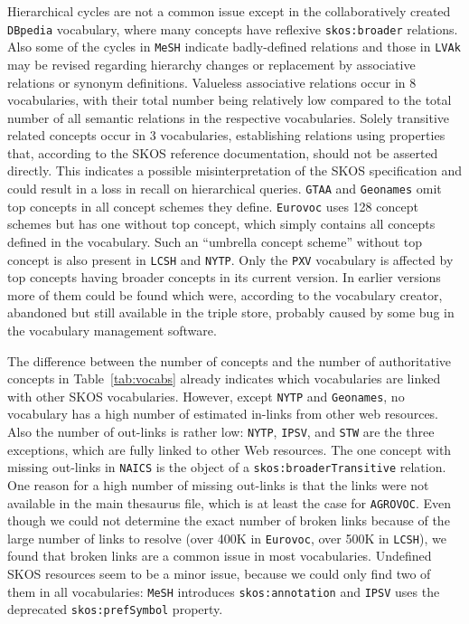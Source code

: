 Hierarchical cycles are not a common issue except in the collaboratively created \texttt{DBpedia} vocabulary, where many concepts have reflexive \texttt{skos:broader} relations. Also some of the cycles in \texttt{MeSH} indicate badly-defined relations and those in \texttt{LVAk} may be revised regarding hierarchy changes or replacement by associative relations or synonym definitions.
Valueless associative relations occur in 8 vocabularies, with their total number being relatively low compared to the total number of all semantic relations in the respective vocabularies.
Solely transitive related concepts occur in 3 vocabularies, establishing relations using properties that, according to the SKOS reference documentation, should not be asserted directly. This indicates a possible misinterpretation of the SKOS specification and could result in a loss in recall on hierarchical queries.
\texttt{GTAA} and \texttt{Geonames} omit top concepts in all concept schemes they define. \texttt{Eurovoc} uses 128 concept schemes but has one without top concept, which simply contains all concepts defined in the vocabulary. Such an ``umbrella concept scheme'' without top concept is also present in \texttt{LCSH} and \texttt{NYTP}.
Only the \texttt{PXV} vocabulary is affected by top concepts having broader concepts in its current version. In earlier versions more of them could be found which were, according to the vocabulary creator, abandoned but still available in the triple store, probably caused by some bug in the vocabulary management software.


The difference between the number of concepts and the number of authoritative concepts in Table~\ref{tab:vocabs} already indicates which vocabularies are linked with other SKOS vocabularies.
However, except \texttt{NYTP} and \texttt{Geonames}, no vocabulary has a high number of estimated in-links from other web resources.
Also the number of out-links is rather low: \texttt{NYTP}, \texttt{IPSV}, and \texttt{STW} are the three exceptions, which are fully linked to other Web resources. The one concept with missing out-links in \texttt{NAICS} is the object of a \texttt{skos:broaderTransitive} relation. One reason for a high number of missing out-links is that the links were not available in the main thesaurus file, which is at least the case for \texttt{AGROVOC}.
Even though we could not determine the exact number of broken links because of the large number of links to resolve  (over 400K in \texttt{Eurovoc}, over 500K in \texttt{LCSH}), we found that broken links are a common issue in most vocabularies.
Undefined SKOS resources seem to be a minor issue, because we could only find two of them in all vocabularies: \texttt{MeSH} introduces \texttt{skos:annotation} and \texttt{IPSV} uses the deprecated \texttt{skos:prefSymbol} property.
